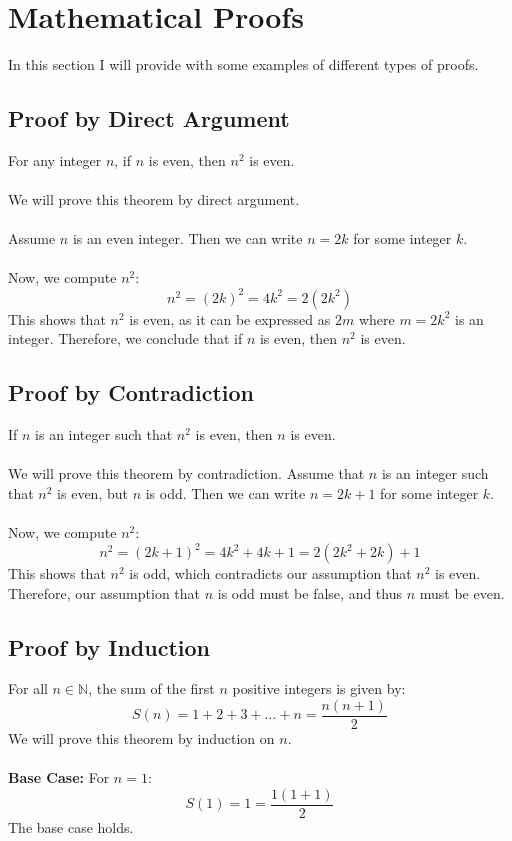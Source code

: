 \section{Mathematical Proofs}

In this section I will provide with some examples of different types of proofs.

\subsection{Proof by Direct Argument}

For any integer \( n \), if \( n \) is even, then \( n^2 \) is even.
\\\\
	We will prove this theorem by direct argument.
\\\\
	Assume \( n \) is an even integer. Then we can write \( n = 2k \) for some integer \( k \).
\\\\
	Now, we compute \( n^2 \):
	\[
		n^2 = (2k)^2 = 4k^2 = 2(2k^2)
	\]
	This shows that \( n^2 \) is even, as it can be expressed as \( 2m \) where \( m = 2k^2 \) is an integer.
	Therefore, we conclude that if \( n \) is even, then \( n^2 \) is even.
\QED

\subsection{Proof by Contradiction}

If \( n \) is an integer such that \( n^2 \) is even, then \( n \) is even.
\\\\
	We will prove this theorem by contradiction. Assume that \( n \) is an integer such that \( n^2 \) is even, but \( n \) is odd. Then we can write \( n = 2k + 1 \) for some integer \( k \).
\\\\
	Now, we compute \( n^2 \):
	\[
		n^2 = (2k + 1)^2 = 4k^2 + 4k + 1 = 2(2k^2 + 2k) + 1
	\]
	This shows that \( n^2 \) is odd, which contradicts our assumption that \( n^2 \) is even. Therefore, our assumption that \( n \) is odd must be false, and thus \( n \) must be even.
\QED

\subsection{Proof by Induction}

For all \( n \in \mathbb{N} \), the sum of the first \( n \) positive integers is given by:
\[
	S(n) = 1 + 2 + 3 + \ldots + n = \frac{n(n+1)}{2}
\]
We will prove this theorem by induction on \( n \).
\\\\
	\textbf{Base Case:} For \( n = 1 \):
	\[
		S(1) = 1 = \frac{1(1+1)}{2}
	\]
	The base case holds.

